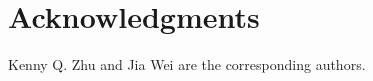 \documentclass[10pt,doc,floatsintext,apacite]{apa6}
\begin{document}




















 





\section*{Acknowledgments}
Kenny Q. Zhu and Jia Wei are the corresponding authors.

% 

\end{document}
